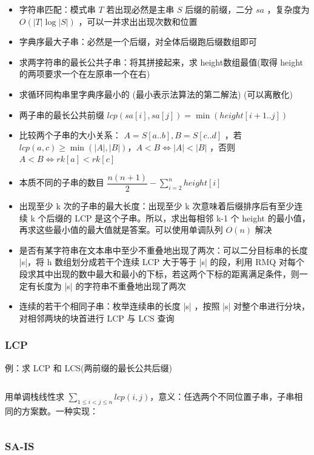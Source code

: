 \documentclass[twocolumn,10pt]{ctexart}
\begin{document}
\begin{itemize}
\item 字符串匹配：模式串 $T$ 若出现必然是主串 $S$ 后缀的前缀，二分 $sa$ ，复杂度为 $O(|T|\log|S|)$ ，可以一并求出出现次数和位置
\item 字典序最大子串：必然是一个后缀，对全体后缀跑后缀数组即可
\item 求两字符串的最长公共子串：将其拼接起来，求 height数组最值(取得 height 的两项要求一个在左原串一个在右)
\item 求循环同构串里字典序最小的 (最小表示法算法的第二解法) (可以离散化)
\item 两子串的最长公共前缀 $lcp(sa[i],\allowbreak{}sa[j])=\min(height[i+1..j])$
\item 比较两个子串的大小关系： $A=S[a..b],B=S[c..d]$ ，若 $lcp(a,\allowbreak{}c)\ge \min(|A|,\allowbreak{}|B|)\text{，}A < B\Leftrightarrow |A|<|B|$ ，否则 $A < B\Leftrightarrow rk[a] < rk[c]$
\item 本质不同的子串的数目 $\dfrac{n(n+1)}2-\sum_{i=2}^nheight[i]$
\item 出现至少 k 次的子串的最大长度：出现至少 k 次意味着后缀排序后有至少连续 k 个后缀的 LCP 是这个子串。所以，求出每相邻 k-1 个 height 的最小值，再求这些最小值的最大值就是答案。可以使用单调队列 $O(n)$ 解决
\item 是否有某字符串在文本串中至少不重叠地出现了两次：可以二分目标串的长度 |s|，将 h 数组划分成若干个连续 LCP 大于等于 |s| 的段，利用 RMQ 对每个段求其中出现的数中最大和最小的下标，若这两个下标的距离满足条件，则一定有长度为 |s| 的字符串不重叠地出现了两次
\item 连续的若干个相同子串：枚举连续串的长度 |s| ，按照 |s| 对整个串进行分块，对相邻两块的块首进行 LCP 与 LCS 查询
\end{itemize}

\subsubsection{LCP}

\begin{notebox}
例：求 LCP 和 LCS(两前缀的最长公共后缀)
\end{notebox}

\inputminted{cpp}{code/ext_059.cpp}

用单调栈线性求 $\sum_{1\le i < j\le n}lcp(i,j)$，意义：任选两个不同位置子串，子串相同的方案数。一种实现：

\inputminted{cpp}{code/ext_060.cpp}

\subsubsection{SA-IS}
\end{document}

